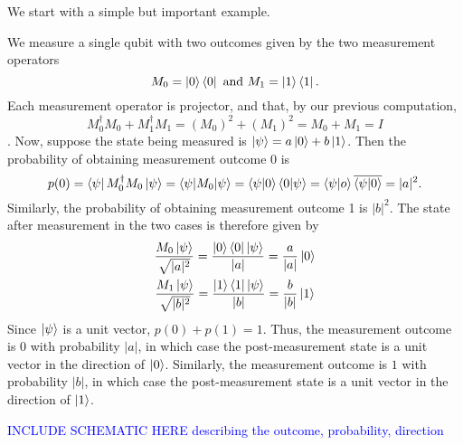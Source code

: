 {We start with a simple but important example.
\begin{example} \label{measurement-standard basis}
We measure a single qubit with two outcomes given by the two measurement operators 
$$M_0=\ket{0}\bra{0}\textrm{ and }M_1=\ket{1}\bra{1}.$$ 
Each measurement operator is projector, and that, by our previous computation,
\begin{equation*}
    M_0^\dagger M_0+M_1^\dagger M_1 = (M_0)^2+(M_1)^2=M_0 + M_1 = I
\end{equation*}.
Now, suppose the state being measured is $\ket{\psi}=a\ket{0}+b\ket{1}$. Then the probability of obtaining measurement outcome 0 is
\begin{equation*}
    p(0) = \bra{\psi}M_0^\dagger M_0 \ket{\psi} = \braket{\psi | M_0 | \psi}=\braket{\psi|0}\braket{0|\psi}=\braket{\psi|o}\overline{\braket{\psi|0}}=|a|^2.
\end{equation*}
Similarly, the probability of obtaining measurement outcome 1 is $|b|^2$.
The state after measurement in the two cases is therefore given by
\begin{gather*}
    \frac{M_0 \ket{\psi}}{\sqrt{|a|^2}}=\frac{\ket{0}\bra{0}\ket{\psi}}{|a|}=\frac{a}{|a|}\ket{0}\\
    \frac{M_1 \ket{\psi}}{\sqrt{|b|^2}}=\frac{\ket{1}\bra{1}\ket{\psi}}{|b|}=\frac{b}{|b|}\ket{1}\\   
\end{gather*}
Since $\ket{\psi}$ is a unit vector, $p(0)+p(1)=1$.  Thus, the measurement outcome is $0$ with probability $|a|$, in which case the post-measurement state is a unit vector in the direction of $\ket{0}$.  Similarly, the measurement outcome is $1$ with probability $|b|$, in which case the post-measurement state is a unit vector in the direction of $\ket{1}$.
\end{example}

\textcolor{blue}{INCLUDE SCHEMATIC HERE describing the outcome, probability, direction}



}
